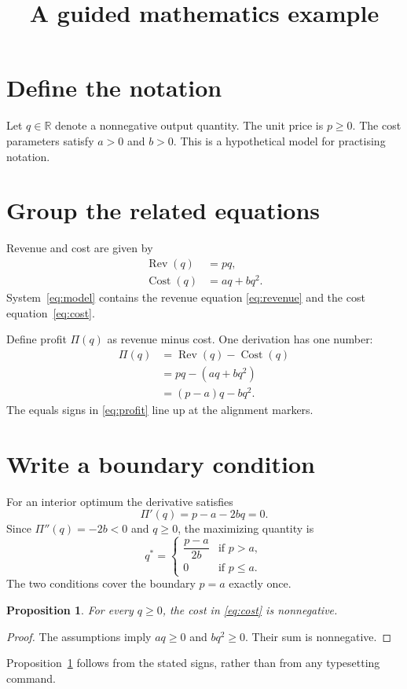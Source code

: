 \documentclass[11pt]{article}
\newtheorem{proposition}{Proposition}[section]
\DeclareMathOperator{\Revenue}{Rev}
\DeclareMathOperator{\Cost}{Cost}
\begin{document}
\title{A guided mathematics example}
\author{}
\date{}
\maketitle
\section{Define the notation}
Let $q\in\mathbb{R}$ denote a nonnegative output quantity.
The unit price is $p\ge0$. The cost parameters satisfy $a>0$ and
$b>0$. This is a hypothetical model for practising notation.

\section{Group the related equations}
Revenue and cost are given by
\begin{subequations}\label{eq:model}
\begin{align}
\Revenue(q)&=pq,\label{eq:revenue}\\
\Cost(q)&=aq+bq^2.\label{eq:cost}
\end{align}
\end{subequations}
System~\eqref{eq:model} contains the revenue equation
\eqref{eq:revenue} and the cost equation~\eqref{eq:cost}.

Define profit $\Pi(q)$ as revenue minus cost. One derivation has
one number:
\begin{equation}\label{eq:profit}
\begin{aligned}
\Pi(q)&=\Revenue(q)-\Cost(q)\\
&=pq-(aq+bq^2)\\
&=(p-a)q-bq^2.
\end{aligned}
\end{equation}
The equals signs in \eqref{eq:profit} line up at the alignment markers.

\section{Write a boundary condition}
For an interior optimum the derivative satisfies
\[
\Pi'(q)=p-a-2bq=0.
\]
Since $\Pi''(q)=-2b<0$ and $q\ge0$, the maximizing quantity is
\[
q^*=\begin{cases}
\dfrac{p-a}{2b}&\text{if }p>a,\\[3pt]
0&\text{if }p\le a.
\end{cases}
\]
The two conditions cover the boundary $p=a$ exactly once.

\begin{proposition}\label{prop:nonnegative-cost}
For every $q\ge0$, the cost in \eqref{eq:cost} is nonnegative.
\end{proposition}
\begin{proof}
The assumptions imply $aq\ge0$ and $bq^2\ge0$.
Their sum is nonnegative.
\end{proof}
Proposition~\ref{prop:nonnegative-cost} follows from the stated signs,
rather than from any typesetting command.
\end{document}
